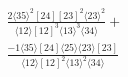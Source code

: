 \documentclass[varwidth, border=5pt]{standalone}
\begin{document}
\begin{my}
$\begin{gathered}
\scriptscriptstyle\frac{2⟨35⟩^2[24][23]^2⟨23⟩^2}{⟨12⟩[12]^3⟨13⟩^3⟨34⟩}+\\
\scriptscriptstyle\frac{-1⟨35⟩[24]⟨25⟩⟨23⟩[23]}{⟨12⟩[12]^2⟨13⟩^2⟨34⟩}\phantom{+}
\end{gathered}$
\end{my}
\end{document}
